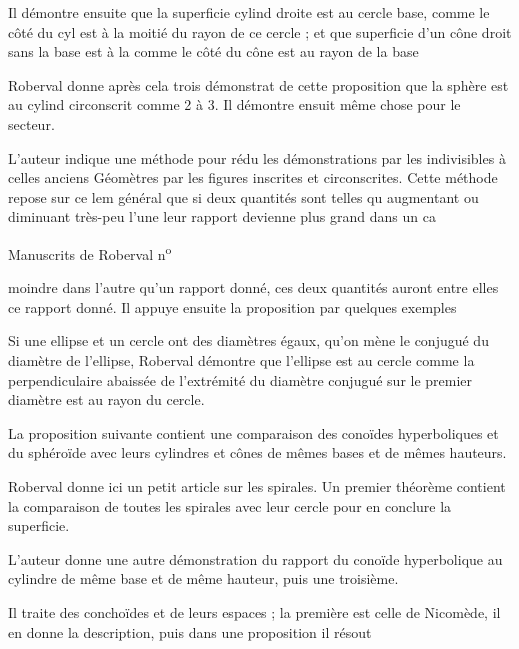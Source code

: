\documentclass[11pt,a4paper]{article}
\begin{document}
Il démontre ensuite que la superficie cylind\ill{} droite est au cercle base, comme le côté du cyl\ill{}
est à la moitié du rayon de ce cercle ; et que \ill{} superficie d'un cône droit sans la base est à la \ill{} comme le côté du cône est au rayon de la base\ill{}

Roberval donne après cela trois démonstrat\ill{} de cette proposition que la sphère est au cylind
circonscrit comme 2 à 3. Il démontre ensuit \ill{} même chose pour le secteur.

L'auteur indique une méthode pour rédu\ill{} les démonstrations par les indivisibles à celles \ill{} anciens Géomètres par les figures inscrites et circonscrites. Cette méthode repose sur ce lem général que si deux quantités sont telles qu\ill{} augmentant ou diminuant très-peu l'une \ill{} leur rapport devienne plus grand dans un ca\ill{}

Manuscrits de Roberval n\textsuperscript{o}

moindre dans l'autre qu'un rapport donné, ces deux quantités auront entre elles ce rapport donné. Il appuye ensuite la proposition par quelques exemples

Si une ellipse et un cercle ont des diamètres égaux, qu'on mène le conjugué du diamètre de l'ellipse, Roberval démontre que l'ellipse est au cercle comme la perpendiculaire abaissée de l'extrémité du diamètre conjugué sur le premier diamètre est au rayon du cercle.

La proposition suivante contient une comparaison des conoïdes hyperboliques et du sphéroïde avec leurs cylindres et cônes de mêmes bases et de mêmes hauteurs.

Roberval donne ici un petit article sur les
spirales. Un premier théorème contient la comparaison de toutes les spirales avec leur cercle pour en conclure la superficie.

L'auteur donne une autre démonstration du rapport du conoïde hyperbolique au cylindre de même base
et de même hauteur, puis une troisième.

Il traite des conchoïdes et de leurs espaces ; la première est celle de Nicomède, il en donne la description, puis dans une proposition il résout
\end{document}
